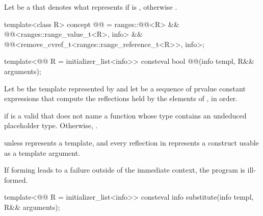 \pnum
Let  be
a  that denotes what  represents
if  is ,
otherwise \tcode{([: x :])}.

\begin{itemdecl}
template<class R>
concept @@ =
  ranges::@@<R> &&
  @@<ranges::range_value_t<R>, info> &&
  @@<remove_cvref_t<ranges::range_reference_t<R>>, info>;

template<@@ R = initializer_list<info>>
  consteval bool @@(info templ, R&& arguments);
\end{itemdecl}

\begin{itemdescr}
\pnum
Let  be the template represented by 
and let  be a sequence of prvalue constant expressions
that compute the reflections held by the elements of ,
in order.

\pnum
\returns
{} if  is a valid 
that does not name a function
whose type contains an undeduced placeholder type.
Otherwise, .

\pnum
\throws
{} unless
 represents a template,
and every reflection in  represents a construct
usable as a template argument.

\pnum
\begin{note}
If forming  leads to a failure
outside of the immediate context,
the program is ill-formed.
\end{note}
\end{itemdescr}

%
\begin{itemdecl}
template<@@ R = initializer_list<info>>
  consteval info substitute(info templ, R&& arguments);
\end{itemdecl}

